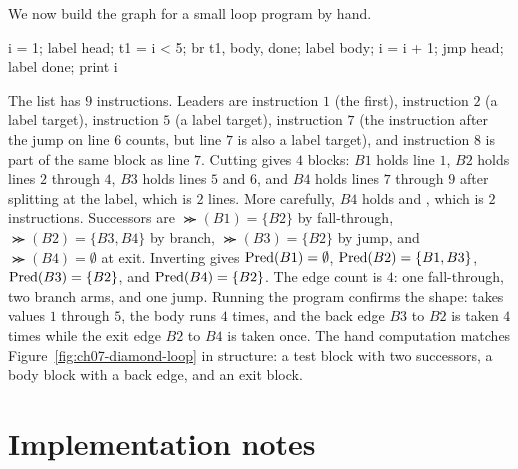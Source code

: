 We now build the graph for a small loop program by hand.
\begin{irlisting}
i = 1;
label head;
t1 = i < 5;
br t1, body, done;
label body;
i = i + 1;
jmp head;
label done;
print i
\end{irlisting}
The list has $9$ instructions.
Leaders are instruction $1$ (the first), instruction $2$ (a label target), instruction $5$ (a label target), instruction $7$ (the instruction after the jump on line $6$ counts, but line $7$ is also a label target), and instruction $8$ is part of the same block as line $7$.
Cutting gives $4$ blocks: $B1$ holds line $1$, $B2$ holds lines $2$ through $4$, $B3$ holds lines $5$ and $6$, and $B4$ holds lines $7$ through $9$ after splitting at the label, which is $2$ lines.
More carefully, $B4$ holds  and , which is $2$ instructions.
Successors are $\Succ(B1) = \{B2\}$ by fall-through, $\Succ(B2) = \{B3, B4\}$ by branch, $\Succ(B3) = \{B2\}$ by jump, and $\Succ(B4) = \emptyset$ at exit.
Inverting gives $\operatorname{Pred}(B1) = \emptyset$, $\operatorname{Pred}(B2) = \{B1, B3\}$, $\operatorname{Pred}(B3) = \{B2\}$, and $\operatorname{Pred}(B4) = \{B2\}$.
The edge count is $4$: one fall-through, two branch arms, and one jump.
Running the program confirms the shape:  takes values $1$ through $5$, the body runs $4$ times, and the back edge $B3$ to $B2$ is taken $4$ times while the exit edge $B2$ to $B4$ is taken once.
The hand computation matches Figure~\ref{fig:ch07-diamond-loop} in structure: a test block with two successors, a body block with a back edge, and an exit block.

\section{Implementation notes}
\label{sec:ch07-implementation}

